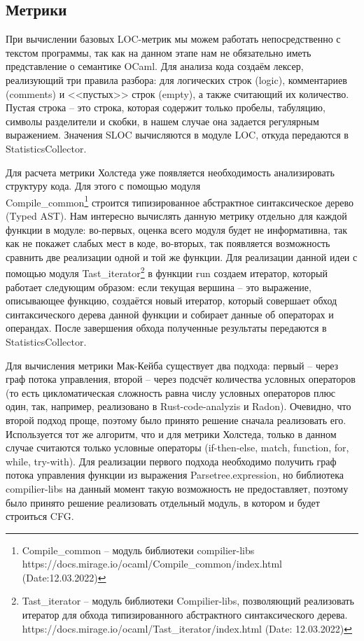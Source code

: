 \subsection{Метрики}
При вычислении базовых LOC-метрик мы можем работать непосредственно с текстом программы,
так как на данном этапе нам не обязательно иметь представление о семантике OCaml. Для анализа кода создаём лексер, реализующий три правила разбора: для логических строк (logic), комментариев (comments) и <<пустых>> строк (empty), а также считающий их количество. Пустая строка -- это строка, которая содержит только пробелы, табуляцию, символы разделители и скобки, в нашем случае она задается регулярным выражением.
Значения SLOC вычисляются в модуле LOC, откуда передаются в StatisticsCollector.

Для расчета метрики Холстеда уже появляется необходимость
анализировать структуру кода. Для этого с помощью модуля \\ Compile\_common\footnote{Compile\_common -- модуль библиотеки compilier-libs\\  https://docs.mirage.io/ocaml/Compile\_common/index.html (Date:12.03.2022)} строится типизированное абстрактное синтаксическое дерево (Typed AST). Нам интересно вычислять данную метрику отдельно для каждой функции в модуле: во-первых, оценка всего модуля будет не информативна, так как не покажет слабых мест в коде, во-вторых, так появляется возможность сравнить две реализации
одной и той же функции. Для реализации данной идеи с помощью модуля Tast\_iterator\footnote{Tast\_iterator -- модуль библиотеки
Compilier-libs, позволяющий реализовать итератор для обхода типизированного абстрактного синтаксического дерева.\\https://docs.mirage.io/ocaml/Tast\_iterator/index.html (Date: 12.03.2022)} в функции run создаем
итератор, который работает следующим образом: если текущая вершина -- это выражение, описывающее функцию, создаётся 
новый итератор, который совершает обход синтаксического дерева данной функции и
собирает данные об операторах и операндах. После завершения обхода полученные
результаты передаются в StatisticsCollector.

Для вычисления метрики Мак-Кейба существует два подхода: первый -- через граф потока управления, второй -- через подсчёт количества условных операторов (то есть цикломатическая сложность равна числу условных операторов плюс один, так, например, реализовано в Rust-code-analyzis и Radon). Очевидно, что второй подход
проще, поэтому было принято решение сначала реализовать его.  
Используется тот же алгоритм, что и для метрики Холстеда, только в данном случае
считаются только условные операторы (if-then-else, match, function, for, while,
try-with). Для реализации первого подхода необходимо получить граф потока управления функции из выражения Parsetree.expression, но библиотека compilier-libs на данный момент такую возможность не предоставляет, поэтому было принято решение
реализовать отдельный модуль, в котором и будет строиться CFG.

